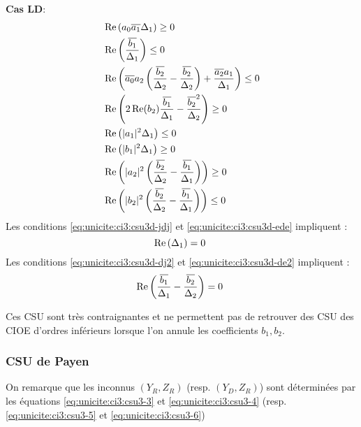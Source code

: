 			\begin{minipage}{0.49\textwidth}
				\textbf{Cas LD}:
				\begin{align}
					\label{eq:unicite:ci3:csu3d-j2}&\Re\left(a_0\conj{a_1}\Delta_1\right) \ge 0 \\
					\label{eq:unicite:ci3:csu3d-e2}&\Re\left(\frac{\conj{b_1}}{\Delta_1}\right) \le 0 \\
					\label{eq:unicite:ci3:csu3d-jrj}&\Re\left(\conj{a_0}a_2\left(\frac{\conj{b_2}}{\Delta_2}-\frac{\conj{b_2}}{\Delta_2}\right) + \frac{\conj{a_2}a_1}{\Delta_1} \right)\le 0\\
					\label{eq:unicite:ci3:csu3d-ere}&\Re\left(2\Re(b_2)\frac{\conj{b_1}}{\Delta_1}-\frac{\conj{b_2}^2}{\Delta_2}\right) \ge 0\\
					\label{eq:unicite:ci3:csu3d-jdj}&\Re\left(|a_1|^2\Delta_1\right) \le 0 \\
					\label{eq:unicite:ci3:csu3d-ede}&\Re\left(|b_1|^2\Delta_1\right) \ge 0 \\
					\label{eq:unicite:ci3:csu3d-dj2}&\Re\left(|a_2|^2\left(\frac{\conj{b_2}}{\Delta_2}-\frac{\conj{b_1}}{\Delta_1}\right)\right)\ge 0\\
					\label{eq:unicite:ci3:csu3d-de2}&\Re\left(|b_2|^2\left(\frac{\conj{b_2}}{\Delta_2}-\frac{\conj{b_1}}{\Delta_1}\right)\right)\le 0
				\end{align}
				Les conditions \eqref{eq:unicite:ci3:csu3d-jdj} et \eqref{eq:unicite:ci3:csu3d-ede} impliquent :
				\begin{equation}
					\Re\left(\Delta_1\right) = 0\\\
				\end{equation}
				Les conditions \eqref{eq:unicite:ci3:csu3d-dj2} et \eqref{eq:unicite:ci3:csu3d-de2} impliquent :
				\begin{equation}
					\Re\left(\frac{\conj{b_1}}{\Delta_1}-\frac{\conj{b_2}}{\Delta_2}\right) = 0\\\
				\end{equation}
			\end{minipage}

			Ces CSU sont très contraignantes et ne permettent pas de retrouver des CSU des CIOE d'ordres inférieurs lorsque l'on annule les coefficients $b_1, b_2$.


		\subsubsection{CSU de Payen}
			On remarque que les inconnus $(Y_R,Z_R)$ (resp. $(Y_D,Z_R)$) sont déterminées par les équations \eqref{eq:unicite:ci3:csu3-3} et \eqref{eq:unicite:ci3:csu3-4} (resp. \eqref{eq:unicite:ci3:csu3-5} et \eqref{eq:unicite:ci3:csu3-6})

